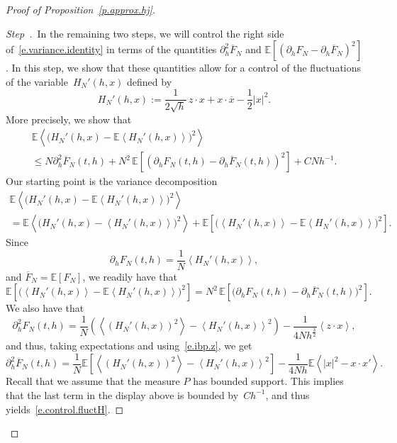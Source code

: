 \documentclass[10pt]{amsart}
\theoremstyle{definition}\newtheorem{defi}[theo]{Definition}\newtheorem{rema}[theo]{Remark}\newtheorem{exam}[theo]{Example}\newtheorem{exem}[theo]{Example}\newtheorem{nota}[theo]{Notation}
\newcommand{\E}{\mathbb{E}}
\newcommand{\1}{\mathds{1}}
\renewcommand{\le}{\leqslant}
\newcommand{\la}{\left\langle}
\newcommand{\ra}{\right\rangle}
\renewcommand{\bar}{\overline}
\newcounter{stepcount}
\newenvironment{step}{\refstepcounter{stepcount}\begin{proof}[Step~\thestepcount]}{\let\qed\relax\end{proof}}
\begin{document}
\begin{proof}[Proof of Proposition~\ref{p.approx.hj}]

\begin{step}\label{st2}
\,In the remaining two steps, we will control the right side of~\eqref{e.variance.identity} in terms of the quantities $\partial_h^2 \bar F_N$ and $\E [(\partial_h F_N - \partial_h \bar F_N)^2 ]$. In this step, we show that these quantities allow for a control of the fluctuations of the variable~$H_N'(h,x)$ defined by
\[
H_N'(h,x) := \frac 1 {2\sqrt {h}} \, z \cdot x + x \cdot \bar x - \frac 1 2 |x|^2.
\]
More precisely, we show that
\begin{multline}\label{e.control.fluctH}
\E \la \big(H_N'(h,x) - \E \la H_N'(h,x) \ra \big) ^2 \ra
\\
\le N \partial_h^2 \bar F_N(t,h) + N^2 \, \E \left[\left(\partial_h F_N(t,h) - \partial_h \bar F_N(t,h) \right) ^2 \right] + C N h^{-1}.
\end{multline}
Our starting point is the variance decomposition
\begin{multline*}
\E \la \big(H_N'(h,x) - \E \la H_N'(h,x) \ra \big) ^2 \ra
\\
= \E \la \big(H_N'(h,x) - \la H_N'(h,x) \ra\big)^2 \ra + \E \left[\big(\la H_N'(h,x) \ra - \E \la H_N'(h,x) \ra\big)^2 \right].
\end{multline*}
Since
\begin{equation}\label{e.formula.partialhF}
\partial_{h} F_N(t,{h}) = \frac 1 N \la H_N'({h},x) \ra,
\end{equation}
and $\bar F_N = \E [F_N]$, we readily have that
\begin{equation*}
\E \left[\big(\la H_N'(h,x) \ra - \E \la H_N'(h,x) \ra\big)^2 \right] = N^2 \, \E \left[\big(\partial_h F_N(t,h) - \partial_h \bar F_N(t,h) \big) ^2 \right].
\end{equation*}
We also have that
\begin{equation}\label{e.partialh2F}
\partial_{h}^2 F_N(t,{h}) = \frac{1}{N} \left(\la \left(H_N'({h},x)\right)^2 \ra -\la H_N'({h},x) \ra^2 \right) - \frac {1}{4N{h}^\frac 3 2} \la z \cdot x \ra,
\end{equation}
and thus, taking expectations and using~\eqref{e.ibp.z}, we get
\[
\partial_{h}^2 \bar F_N(t,{h}) = \frac{1}{N} \E \left[\la \left(H_N'({h},x)\right)^2 \ra -\la H_N'({h},x) \ra^2 \right] - \frac 1 {4N {h}} \E \la |x|^2 - x \cdot x' \ra.
\]
Recall that we assume that the measure $P$ has bounded support. This implies that the last term in the display above is bounded by~$C h^{-1}$, and thus yields~\eqref{e.control.fluctH}.
\end{step}


\end{proof}
\end{document}
